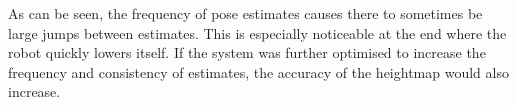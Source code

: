         \noindent
        As can be seen, the frequency of pose estimates causes there to sometimes be large jumps between estimates. This is especially noticeable at the end where the robot quickly lowers itself. If the system was further optimised to increase the frequency and consistency of estimates, the accuracy of the heightmap would also increase.

